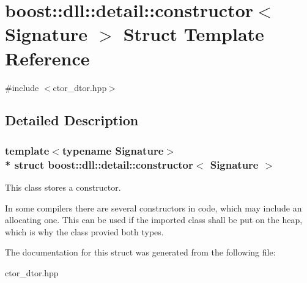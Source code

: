 \hypertarget{a00063}{}\section{boost\+:\+:dll\+:\+:detail\+:\+:constructor$<$ Signature $>$ Struct Template Reference}
\label{a00063}


{\ttfamily \#include $<$ctor\+\_\+dtor.\+hpp$>$}



\subsection{Detailed Description}
\subsubsection*{template$<$typename Signature$>$\\*
struct boost\+::dll\+::detail\+::constructor$<$ Signature $>$}

This class stores a constructor.

In some compilers there are several constructors in code, which may include an allocating one. This can be used if the imported class shall be put on the heap, which is why the class provied both types. 

The documentation for this struct was generated from the following file\+:\begin{DoxyCompactItemize}
\item 
ctor\+\_\+dtor.\+hpp\end{DoxyCompactItemize}
